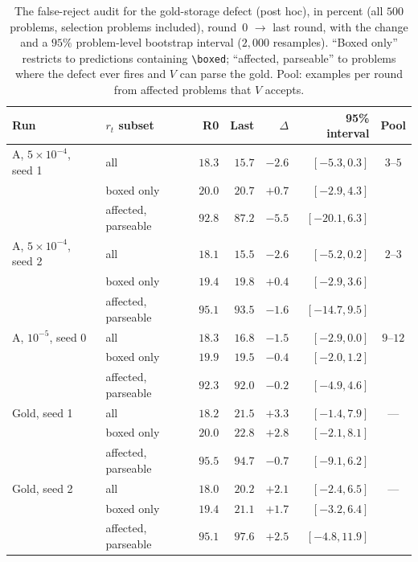 \documentclass[runningheads]{llncs}
\begin{document}
\begin{table}[!htb]
\caption{The false-reject audit for the gold-storage defect (post hoc), in
percent (all $500$ problems, selection problems included), round~0 $\to$ last round, with the change and a $95\%$ problem-level bootstrap interval ($2{,}000$
resamples). ``Boxed only'' restricts to predictions containing
\texttt{\textbackslash boxed}; ``affected, parseable'' to problems where the
defect ever fires and $V$ can parse the gold. Pool: examples per round from
affected problems that $V$ accepts.}
\label{tab:rt}
\centering
\footnotesize
\setlength{\tabcolsep}{4pt}
\begin{tabular}{llrrrrc}
\toprule
Run & $r_t$ subset & R0 & Last & $\Delta$ & 95\% interval & Pool \\
\midrule
A, $5\times10^{-4}$, seed 1 & all & $18.3$ & $15.7$ & $-2.6$ & $[-5.3, 0.3]$ & $3$--$5$ \\
 & boxed only & $20.0$ & $20.7$ & $+0.7$ & $[-2.9, 4.3]$ & \\
 & affected, parseable & $92.8$ & $87.2$ & $-5.5$ & $[-20.1, 6.3]$ & \\
A, $5\times10^{-4}$, seed 2 & all & $18.1$ & $15.5$ & $-2.6$ & $[-5.2, 0.2]$ & $2$--$3$ \\
 & boxed only & $19.4$ & $19.8$ & $+0.4$ & $[-2.9, 3.6]$ & \\
 & affected, parseable & $95.1$ & $93.5$ & $-1.6$ & $[-14.7, 9.5]$ & \\
A, $10^{-5}$, seed 0 & all & $18.3$ & $16.8$ & $-1.5$ & $[-2.9, 0.0]$ & $9$--$12$ \\
 & boxed only & $19.9$ & $19.5$ & $-0.4$ & $[-2.0, 1.2]$ & \\
 & affected, parseable & $92.3$ & $92.0$ & $-0.2$ & $[-4.9, 4.6]$ & \\
Gold, seed 1 & all & $18.2$ & $21.5$ & $+3.3$ & $[-1.4, 7.9]$ & --- \\
 & boxed only & $20.0$ & $22.8$ & $+2.8$ & $[-2.1, 8.1]$ & \\
 & affected, parseable & $95.5$ & $94.7$ & $-0.7$ & $[-9.1, 6.2]$ & \\
Gold, seed 2 & all & $18.0$ & $20.2$ & $+2.1$ & $[-2.4, 6.5]$ & --- \\
 & boxed only & $19.4$ & $21.1$ & $+1.7$ & $[-3.2, 6.4]$ & \\
 & affected, parseable & $95.1$ & $97.6$ & $+2.5$ & $[-4.8, 11.9]$ & \\
\bottomrule
\end{tabular}
\end{table}
\end{document}
